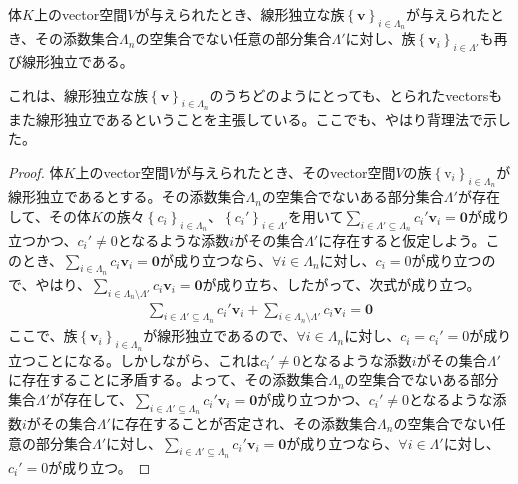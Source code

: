 \documentclass[dvipdfmx]{jsarticle}
\begin{document}
\begin{thm}\label{2.1.1.13}
体$K$上のvector空間$V$が与えられたとき、線形独立な族$\left\{ \mathbf{v} \right\}_{i\in \varLambda_n } $が与えられたとき、その添数集合$\varLambda_{n}$の空集合でない任意の部分集合$\varLambda'$に対し、族$\left\{ \mathbf{v}_i \right\}_{i \in \varLambda' } $も再び線形独立である。
\end{thm}\par
これは、線形独立な族$\left\{ \mathbf{v} \right\}_{i\in \varLambda_n } $のうちどのようにとっても、とられたvectorsもまた線形独立であるということを主張している。ここでも、やはり背理法で示した。
\begin{proof}
体$K$上のvector空間$V$が与えられたとき、そのvector空間$V$の族$\left\{ \mathrm{v}_i \right\}_{i\in \varLambda_n } $が線形独立であるとする。その添数集合$\varLambda_{n}$の空集合でないある部分集合$\varLambda'$が存在して、その体$K$の族々$\left\{ c_{i} \right\}_{i \in \varLambda_{n}}$、$\left\{ c_{i}' \right\}_{i \in \varLambda'}$を用いて$\sum_{i \in \varLambda' \subseteq \varLambda_{n}} {c_{i}'\mathbf{v}_{i}} = \mathbf{0}$が成り立つかつ、$c_{i}' \neq 0$となるような添数$i$がその集合$\varLambda'$に存在すると仮定しよう。このとき、$\sum_{i \in \varLambda_{n}} {c_{i}\mathbf{v}_{i}} = \mathbf{0}$が成り立つなら、$\mathbf{\forall}i \in \varLambda_{n}$に対し、$c_{i} = 0$が成り立つので、やはり、$\sum_{i \in \varLambda_{n} \setminus \varLambda'} {c_{i}\mathbf{v}_{i}} = \mathbf{0}$が成り立ち、したがって、次式が成り立つ。
\begin{align*}
\sum_{i \in \varLambda' \subseteq \varLambda_{n}} {c_{i}'\mathbf{v}_{i}} + \sum_{i \in \varLambda_{n} \setminus \varLambda'} {c_{i}\mathbf{v}_{i}} = \mathbf{0}
\end{align*}
ここで、族$\left\{ \mathbf{v}_i \right\}_{i\in \varLambda_n } $が線形独立であるので、$\mathbf{\forall}i \in \varLambda_{n}$に対し、$c_{i} = c_{i}' = 0$が成り立つことになる。しかしながら、これは$c_{i}' \neq 0$となるような添数$i$がその集合$\varLambda'$に存在することに矛盾する。よって、その添数集合$\varLambda_{n}$の空集合でないある部分集合$\varLambda'$が存在して、$\sum_{i \in \varLambda' \subseteq \varLambda_{n}} {c_{i}'\mathbf{v}_{i}} = \mathbf{0}$が成り立つかつ、$c_{i}' \neq 0$となるような添数$i$がその集合$\varLambda'$に存在することが否定され、その添数集合$\varLambda_{n}$の空集合でない任意の部分集合$\varLambda'$に対し、$\sum_{i \in \varLambda' \subseteq \varLambda_{n}} {c_{i}'\mathbf{v}_{i}} = \mathbf{0}$が成り立つなら、$\forall i \in \varLambda'$に対し、$c_{i}' = 0$が成り立つ。
\end{proof}
\end{document}
